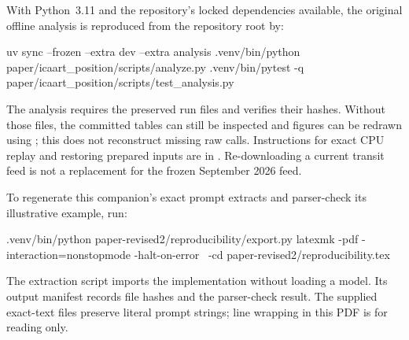 \documentclass[11pt,a4paper]{scrartcl}
\begin{document}
With Python~3.11 and the repository's locked dependencies available, the original offline analysis is reproduced from the repository root by:
\begin{Code}
uv sync --frozen --extra dev --extra analysis
.venv/bin/python paper/icaart_position/scripts/analyze.py
.venv/bin/pytest -q paper/icaart_position/scripts/test_analysis.py
\end{Code}
The analysis requires the preserved run files and verifies their hashes. Without those files, the committed tables can still be inspected and figures can be redrawn using ; this does not reconstruct missing raw calls. Instructions for exact CPU replay and restoring prepared inputs are in . Re-downloading a current transit feed is not a replacement for the frozen September 2026 feed.

To regenerate this companion's exact prompt extracts and parser-check its illustrative example, run:
\begin{Code}
.venv/bin/python paper-revised2/reproducibility/export.py
latexmk -pdf -interaction=nonstopmode -halt-on-error \
  -cd paper-revised2/reproducibility.tex
\end{Code}
The extraction script imports the implementation without loading a model. Its output manifest records file hashes and the parser-check result. The supplied exact-text files preserve literal prompt strings; line wrapping in this PDF is for reading only.
\end{document}
